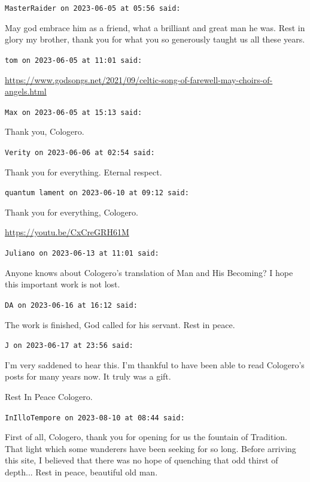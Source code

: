 \begin{footnotesize}
\begin{sffamily}
\hfill

\texttt{MasterRaider on 2023-06-05 at 05:56 said:}

May god embrace him as a friend, what a brilliant and great man he was. Rest in glory my brother, thank you for what you so generously taught us all these years.

\hfill

\texttt{tom on 2023-06-05 at 11:01 said:}

\url{https://www.godsongs.net/2021/09/celtic-song-of-farewell-may-choirs-of-angels.html}


\hfill

\texttt{Max on 2023-06-05 at 15:13 said:}

Thank you, Cologero.

\hfill

\texttt{Verity on 2023-06-06 at 02:54 said:}

Thank you for everything. Eternal respect.

\hfill

\texttt{quantum lament on 2023-06-10 at 09:12 said:}

Thank you for everything, Cologero.

\url{https://youtu.be/CxCreGRH61M}


\hfill

\texttt{Juliano on 2023-06-13 at 11:01 said:}

Anyone knows about Cologero's translation of Man and His Becoming? I hope this important work is not lost.

\hfill

\texttt{DA on 2023-06-16 at 16:12 said:}

The work is finished, God called for his servant. Rest in peace.

\hfill

\texttt{J on 2023-06-17 at 23:56 said:}

I'm very saddened to hear this. I'm thankful to have been able to read Cologero's posts for many years now. It truly was a gift.

Rest In Peace Cologero.

\hfill

\texttt{InIlloTempore on 2023-08-10 at 08:44 said:}

First of all, Cologero, thank you for opening for us the fountain of Tradition. That light which some wanderers have been seeking for so long. Before arriving this site, I believed that there was no hope of quenching that odd thirst of depth... Rest in peace, beautiful old man.


\end{sffamily}
\end{footnotesize}

